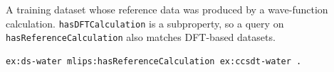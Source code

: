 A training dataset whose reference data was produced by a wave-function calculation. \texttt{hasDFTCalculation} is a subproperty, so a query on \texttt{hasReferenceCalculation} also matches DFT-based datasets.
\begin{lstlisting}[language=turtle]
ex:ds-water mlips:hasReferenceCalculation ex:ccsdt-water .
\end{lstlisting}
